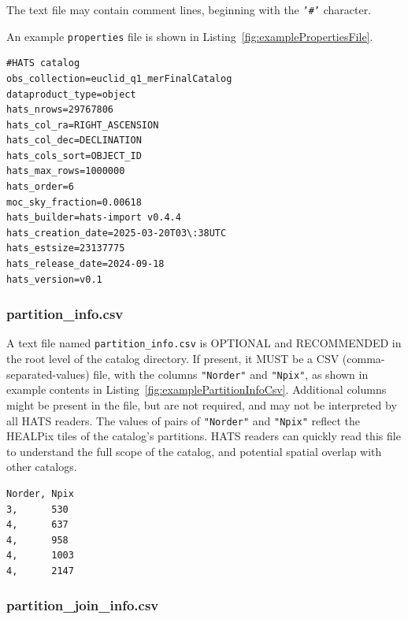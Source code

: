 \documentclass[11pt,a4paper]{ivoa}
\begin{document}
The text file may contain comment lines, beginning with the \texttt{'\#'} character.

An example \texttt{properties} file is shown in Listing~\ref{fig:examplePropertiesFile}.

\begin{minipage}{\linewidth}
\begin{lstlisting}[caption=Example \texttt{properties} file contents, label=fig:examplePropertiesFile]
#HATS catalog
obs_collection=euclid_q1_merFinalCatalog
dataproduct_type=object
hats_nrows=29767806
hats_col_ra=RIGHT_ASCENSION
hats_col_dec=DECLINATION
hats_cols_sort=OBJECT_ID
hats_max_rows=1000000
hats_order=6
moc_sky_fraction=0.00618
hats_builder=hats-import v0.4.4
hats_creation_date=2025-03-20T03\:38UTC
hats_estsize=23137775
hats_release_date=2024-09-18
hats_version=v0.1
\end{lstlisting}
\end{minipage}

\subsubsection{partition\_info.csv} 

A text file named \texttt{partition\_info.csv} is OPTIONAL and RECOMMENDED in the root level of the catalog directory.
If present, it MUST be a CSV (comma-separated-values) file, with the columns \texttt{"Norder"} and \texttt{"Npix"}, as shown in example contents in Listing~\ref{fig:examplePartitionInfoCsv}.
Additional columns might be present in the file, but are not required, and may not be interpreted by all HATS readers.
The values of pairs of \texttt{"Norder"} and \texttt{"Npix"} reflect the HEALPix tiles of the catalog's partitions. 
HATS readers can quickly read this file to understand the full scope of the catalog, and potential spatial overlap with other catalogs.

\begin{minipage}{\linewidth}
\begin{lstlisting}[caption=Example \texttt{partition\_info.csv} file contents, label=fig:examplePartitionInfoCsv]    
Norder,	Npix
3,      530
4,      637
4,      958
4,      1003
4,      2147
\end{lstlisting}
\end{minipage}

\subsubsection{partition\_join\_info.csv} 
\end{document}

